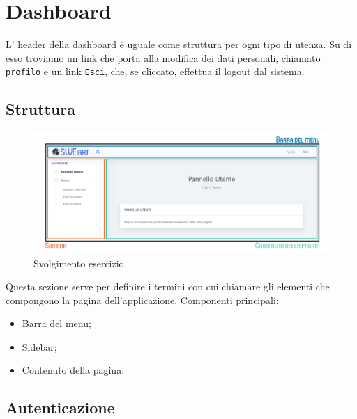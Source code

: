 \section{Dashboard}
  L' header della dashboard è uguale come struttura per ogni tipo di utenza. Su di esso troviamo un link che porta alla modifica dei dati personali, chiamato \texttt{profilo} e un link \texttt{Esci}, che, se cliccato, effettua il logout dal sistema.



\subsection{Struttura}
    \begin{figure}[H]
        \centering
        \includegraphics[width=17cm]{sez/img/istruzioni/dashboardMod.png} 
        \caption{Svolgimento esercizio}\label{fig:1}
    \end{figure}
  Questa sezione serve per definire i termini con cui chiamare gli elementi che compongono la pagina dell'applicazione.
    Componenti principali:
    \begin{itemize}
        \item Barra del menu;
        \item {Sidebar};
        \item Contenuto della pagina.
    \end{itemize}


\subsection{Autenticazione}
